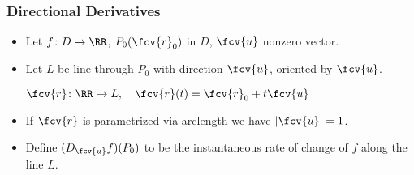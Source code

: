 \begin{frame}
  \frametitle{Directional Derivatives}
\begin{itemize}
\item  Let $f \colon D \to \RR$, $P_0(\fcv{r}_0)$ in $D$, $\fcv{u}$ nonzero vector.
\item<2-> Let $L$ be line through $P_0$ with direction $\fcv{u}$, \alert<1->{oriented} by $\fcv{u}$.

\hfil{} $\fcv{r}\colon \RR \to L, \quad \fcv{r}(t) = \fcv{r}_0+t\fcv{u}$

\item<4-> If $\fcv{r}$ is parametrized via arclength we have $|\fcv{u}|=1$.
\item<6-> Define $(D_{\fcv{u}} f)(P_0)$ to be the instantaneous rate of change of $f$ along the line $L$.
\end{itemize}
\end{frame}
